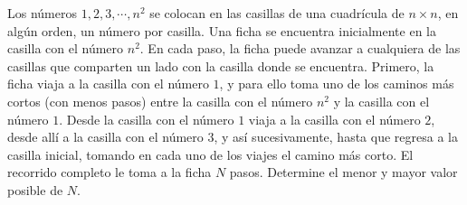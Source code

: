 Los números $1,2,3, \cdots , n^2$ se colocan en las casillas de una cuadrícula de $n \times n$, en algún orden, un número por casilla. Una ficha se encuentra inicialmente en la casilla con el número $n^2$. En cada paso, la ficha puede avanzar a cualquiera de las casillas que comparten un lado con la casilla donde se encuentra. Primero, la ficha viaja a la casilla con el número $1$, y para ello toma uno de los caminos más cortos (con menos pasos) entre la casilla con el número $n^2$ y la casilla con el número $1$. Desde la casilla con el número $1$ viaja a la casilla con el número $2$, desde allí a la casilla con el número $3$, y así sucesivamente, hasta que regresa a la casilla inicial, tomando en cada uno de los viajes el camino más corto. El recorrido completo le toma a la ficha $N$ pasos. Determine el menor y mayor valor posible de $N$.
